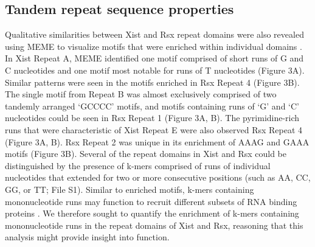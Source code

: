 \subsection{Tandem repeat sequence properties}
Qualitative similarities between Xist and Rsx repeat domains were also revealed using MEME to visualize motifs that were enriched within individual domains \cite{Bailey2009MEMESearching}. In Xist Repeat A, MEME identified one motif comprised of short runs of G and C nucleotides and one motif most notable for runs of T nucleotides (Figure 3A). Similar patterns were seen in the motifs enriched in Rsx Repeat 4 (Figure 3B). The single motif from Repeat B was almost exclusively comprised of two tandemly arranged ‘GCCCC’ motifs, and motifs containing runs of ‘G’ and ‘C’ nucleotides could be seen in Rsx Repeat 1 (Figure 3A, B). The pyrimidine-rich runs that were characteristic of Xist Repeat E were also observed Rsx Repeat 4 (Figure 3A, B). Rsx Repeat 2 was unique in its enrichment of AAAG and GAAA motifs (Figure 3B).
Several of the repeat domains in Xist and Rsx could be distinguished by the presence of k-mers comprised of runs of individual nucleotides that extended for two or more consecutive positions (such as AA, CC, GG, or TT; File S1). Similar to enriched motifs, k-mers containing mononucleotide runs may function to recruit different subsets of RNA binding proteins \cite{Dominguez2018SequenceProteins,Ray2013ARegulation}. We therefore sought to quantify the enrichment of k-mers containing mononucleotide runs in the repeat domains of Xist and Rsx, reasoning that this analysis might provide insight into function. 
